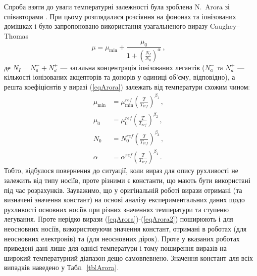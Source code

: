 \documentclass[12pt,a4paper,titlepage,oneside]{book}
\numberwithin{equation}{part}
\begin{document}
Спроба взяти до уваги температурні залежності була зроблена N.~Arora зі співавторами \cite{Arora1982}.
При цьому розглядалися розсіяння на фононах та  іонізованих домішках і було запропоновано використання узагальненого виразу Caughey--Thomas
\begin{equation}\label{eqArora}
  \mu=\mu_\mathrm{min}+\frac{\mu_0}{1+\left(\frac{N_I}{N_0}\right)^\alpha}\,,
\end{equation}
де $N_I=N_a^-+N_d^+$ --- загальна концентрація іонізованих легантів
($N_a^-$ та $N_d^+$ --- кількості іонізованих акцепторів та донорів у одиниці об'єму, відповідно),
а решта коефіцієнтів у виразі (\ref{eqArora}) залежать від температури схожим чином:
\begin{equation}\label{eqArora2}
\begin{aligned}
    \mu_\mathrm{min} &=\mu_\mathrm{min}^{ref}\left(\frac{T}{T_{ref}}\right)^{\beta_1}\,, \\
   \mu_0 &=\mu_0^{ref}\left(\frac{T}{T_{ref}}\right)^{\beta_2}\,,\\
   N_0 &=N_0^{ref}\left(\frac{T}{T_{ref}}\right)^{\beta_3}\,,\\
   \alpha &=\alpha^{ref}\left(\frac{T}{T_{ref}}\right)^{\beta_4}\,.\
\end{aligned}
\end{equation}
Тобто, відбулося повернення до ситуації, коли вираз для опису рухливості не залежить від типу носіїв, проте
різними є константи, що мають бути використані під час розрахунків.
Зауважимо, що у оригінальній роботі \cite{Arora1982} вирази отримані (та визначені значення констант)
на основі аналізу експериментальних даних щодо рухливості основних носіїв при різних значеннях температури та ступеню легування.
Проте нерідко вирази (\ref{eqArora})-(\ref{eqArora2}) поширюють і для неосновних носіїв, використовуючи значення констант,
отримані в роботах \cite{Swirhun1986} (для неосновних електронів) та \cite{Alamo1985} (для неосновних дірок).
Проте у вказаних роботах приведені дані лише для однієї температури і тому поширення виразів на широкий температурний діапазон дещо самовпевнено.
Значення констант для всіх випадків наведено у Табл.~\ref{tblArora}.
\end{document}
